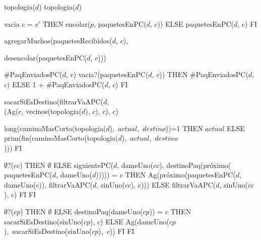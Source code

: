 \begin{tad}{}

	 {topologia($d$)}
	 {topologia($d$)}

	 {vacia}
	 { \IF $c$ = $c'$
																	THEN encolar($p$, paquetesEnPC($d$, $c$))
																	ELSE paquetesEnPC($d$, $c$)
																	FI}	
			  {agregarMuchos(paquetesRecibidos($d$, $c$), 			  
			  
			  \hspace{6.5em}  desencolar(paquetesEnPC($d$, $c$)))}
	
	 {\#PaqEnviadosPC($d$, $c$)}
	 { \IF vacia?(paquetesEnPC($d$, $c$))
															 THEN \#PaqEnviadosPC($d$, $c$)
															 ELSE 1 + \#PaqEnviadosPC($d$, $c$)
															 FI}	
	
	 {sacarSiEsDestino(filtrarVaAPC($d$, \\
												(Ag($c$, vecinos(topologia($d$), $c$), $c$), $c$)}
	
	 {\IF \mbox{long(caminoMasCorto(topologia($d$), $actual$, $destino$))=1}
													   THEN $actual$
													   ELSE \mbox{prim(fin(caminoMasCorto(topologia($d$), $actual$, $destino$}
													   \\)))
													   FI}
	
	 {\IF $\emptyset?$($cc$)
										 	THEN $\emptyset$
										 	ELSE {\IF siguientePC($d$, dameUno($cc$), destinoPaq(próximo(
										 			   paquetesEnPC($d$, dameUno($d$))))) = $c$
										 			THEN Ag(próximo(paquetesEnPC($d$, dameUno($c$)), filtrarVaAPC($d$, sinUno($cc$), $c$)))
										 			ELSE filtrarVaAPC($d$, sinUno($cc$), $c$)
										 			FI}
											 FI}
	
	 {\IF $\emptyset?$($cp$)
											 THEN $\emptyset$
											 ELSE {\IF destinoPaq(dameUno($cp$)) = $c$
											 		THEN sacarSiEsDestino(sinUno($cp$), $c$)
											 		ELSE \mbox{Ag(dameUno($cp$), sacarSiEsDestino(sinUno($cp$), $c$))}
											 		FI}
											 FI} 	
	

\end{tad}
